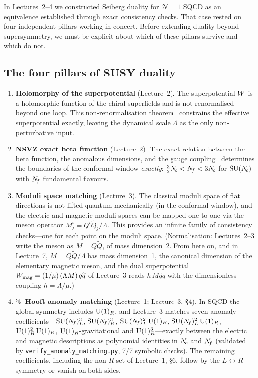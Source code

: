 \documentclass[11pt,a4paper]{article}
\begin{document}
In Lectures~2--4 we constructed Seiberg duality for $\mathcal{N}=1$
SQCD as an equivalence established through exact consistency checks.  That
case rested on four independent pillars working in concert.  Before
extending duality beyond supersymmetry, we must be explicit about
which of these pillars survive and which do not.

\subsection{The four pillars of SUSY duality}

\begin{enumerate}[label=(\roman*),leftmargin=*]
  \item \textbf{Holomorphy of the superpotential} (Lecture~2).  The
    superpotential $W$ is a holomorphic function of the chiral
    superfields and is not renormalised beyond one loop.  This
    non-renormalisation theorem~\cite{Seiberg1993} constrains the
    effective superpotential exactly, leaving the dynamical scale
    $\Lambda$ as the only non-perturbative input.

  \item \textbf{NSVZ exact beta function} (Lecture~2).  The exact
    relation between the beta function, the anomalous dimensions, and
    the gauge coupling~\cite{NSVZ1983} determines the boundaries of
    the conformal window \emph{exactly}: $\tfrac{3}{2}N_{\!c} < N_{\!f} < 3N_{\!c}$
    for $\mathrm{SU}(N_{\!c})$ with $N_{\!f}$ fundamental flavours.

  \item \textbf{Moduli space matching} (Lecture~3).  The classical
    moduli space of flat directions is not lifted quantum mechanically
    (in the conformal window), and the electric and magnetic moduli
    spaces can be mapped one-to-one via the meson operator
    $M^i_j = Q^i \widetilde{Q}_j / \Lambda$.  This provides an
    infinite family of consistency checks---one for each point on the
    moduli space.  (Normalisation: Lectures~2--3 write the meson as
    $M = Q\widetilde{Q}$, of mass dimension~2.  From here on, and in
    Lecture~7, $M = Q\widetilde{Q}/\Lambda$ has mass dimension~1, the
    canonical dimension of the elementary magnetic meson, and the dual
    superpotential $W_{\mathrm{mag}} = (1/\mu)\,(\Lambda M)\,q\widetilde{q}$
    of Lecture~3 reads $h\,M q\widetilde{q}$ with the dimensionless
    coupling $h = \Lambda/\mu$.)

  \item \textbf{'t~Hooft anomaly matching} (Lecture~1; Lecture~3,
    \S4).  In SQCD the global symmetry includes $\mathrm{U}(1)_R$, and
    Lecture~3 matches seven anomaly coefficients---$\mathrm{SU}(N_{\!f})_L^3$,
    $\mathrm{SU}(N_{\!f})_R^3$, $\mathrm{SU}(N_{\!f})_L^2\,\mathrm{U}(1)_B$, $\mathrm{SU}(N_{\!f})_L^2\,\mathrm{U}(1)_R$,
    $\mathrm{U}(1)_B^2\,\mathrm{U}(1)_R$, $\mathrm{U}(1)_R$-gravitational and
    $\mathrm{U}(1)_R^3$---exactly between the electric and magnetic descriptions
    as polynomial identities in $N_{\!c}$ and $N_{\!f}$ (validated by
    \texttt{verify\_anomaly\_matching.py}, 7/7 symbolic checks).  The
    remaining coefficients, including the non-$R$ set of Lecture~1, \S6,
    follow by the $L \leftrightarrow R$ symmetry or vanish on both sides.
\end{enumerate}
\end{document}
